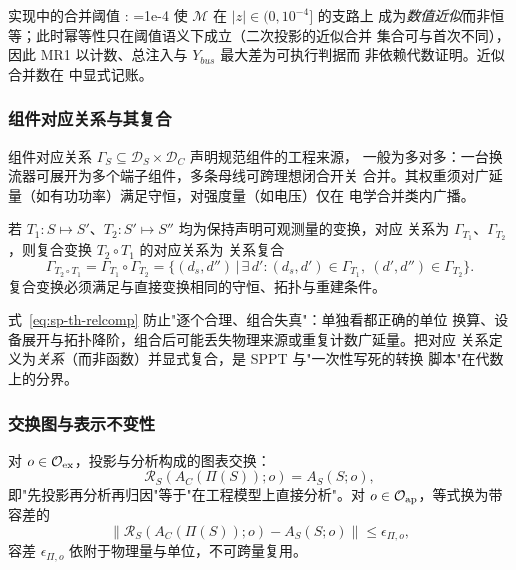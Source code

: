 \begin{gapnote}
实现中的合并阈值 :
=1e-4 使 $\mathcal M$ 在 $|z|\in(0,10^{-4}]$ 的支路上
成为\emph{数值近似}而非恒等；此时幂等性只在阈值语义下成立（二次投影的近似合并
集合可与首次不同），因此 MR1 以计数、总注入与 $Y_{bus}$ 最大差为可执行判据而
非依赖代数证明。近似合并数在 
中显式记账。
\end{gapnote}

\subsubsection{组件对应关系与其复合}
\begin{definition}[组件对应关系]\label{def:sp-th-gamma}
组件对应关系
$\Gamma_S\subseteq\mathcal D_S\times\mathcal D_C$ 声明规范组件的工程来源，
一般为多对多：一台换流器可展开为多个端子组件，多条母线可跨理想闭合开关
合并。其权重须对广延量（如有功功率）满足守恒，对强度量（如电压）仅在
电学合并类内广播。
\end{definition}

\begin{definition}[关系复合]\label{def:sp-th-relcomp}
若 $T_1:S\mapsto S'$、$T_2:S'\mapsto S''$ 均为保持声明可观测量的变换，对应
关系为 $\Gamma_{T_1}$、$\Gamma_{T_2}$，则复合变换 $T_2\circ T_1$ 的对应关系为
关系复合
\begin{equation}
\Gamma_{T_2\circ T_1}=\Gamma_{T_1}\circ\Gamma_{T_2}
=\bigl\{(d_s,d'')\,\big|\,\exists\, d':(d_s,d')\in\Gamma_{T_1},\
(d',d'')\in\Gamma_{T_2}\bigr\}.
\label{eq:sp-th-relcomp}
\end{equation}
复合变换必须满足与直接变换相同的守恒、拓扑与重建条件。
\end{definition}

\begin{remark}[组合性要求的意义]
式~\eqref{eq:sp-th-relcomp} 防止"逐个合理、组合失真"：单独看都正确的单位
换算、设备展开与拓扑降阶，组合后可能丢失物理来源或重复计数广延量。把对应
关系定义为\emph{关系}（而非函数）并显式复合，是 SPPT 与"一次性写死的转换
脚本"在代数上的分界。
\end{remark}

\subsubsection{交换图与表示不变性}
\begin{definition}[精确语义保持]\label{def:sp-th-commute}
对 $o\in\mathcal O_{\rm ex}$，投影与分析构成的图表交换：
\begin{equation}
\mathcal R_S\!\left(A_C(\Pi(S));o\right)=A_S(S;o),
\label{eq:sp-th-commute}
\end{equation}
即"先投影再分析再归因"等于"在工程模型上直接分析"。对
$o\in\mathcal O_{\rm ap}$，等式换为带容差的
\begin{equation}
\bigl\|\mathcal R_S\!\left(A_C(\Pi(S));o\right)-A_S(S;o)\bigr\|
\le\epsilon_{\Pi,o},
\label{eq:sp-th-approx}
\end{equation}
容差 $\epsilon_{\Pi,o}$ 依附于物理量与单位，不可跨量复用。
\end{definition}

